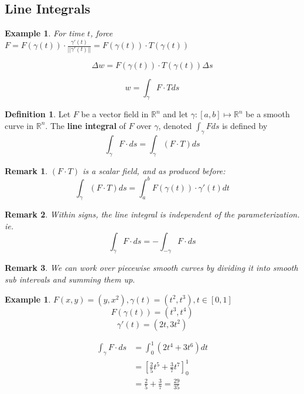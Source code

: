 \documentclass[12pt]{article}
\theoremstyle{plain}
\newtheorem*{remark}{Remark}
\newtheorem{example}[theorem]{Example}
\theoremstyle{definition}
\newtheorem{definition}[theorem]{Definition}
\begin{document}
\subsection{Line Integrals}

\begin{example}
	For time $t$, force $F = F(\gamma(t)) \cdot \frac{\gamma ' (t)}{||\gamma ' (t)||} = F(\gamma (t)) \cdot T (\gamma (t))$

	$$\Delta w = F(\gamma(t)) \cdot T (\gamma (t)) \Delta s$$

	$$w= \int_\gamma F \cdot T ds$$

\end{example}

\begin{definition}
	Let $F$ be a vector field in $\mathbb{R}^n$ and let $\gamma : [a,b] \mapsto \mathbb{R}^n$ be a smooth curve in $\mathbb{R}^n$. The \textbf{line integral} of $F$ over $\gamma$, denoted $\int_\gamma F ds$ is defined by
	$$\int_\gamma F \cdot ds = \int_\gamma ( F \cdot T) ds$$
\end{definition}

\begin{remark}
	$(F \cdot T)$ is a scalar field, and as produced before:
	$$\int_\gamma ( F \cdot T) ds = \int_a^b F(\gamma(t)) \cdot \gamma ' (t) dt$$
\end{remark}

\begin{remark}
	Within signs, the line integral is independent of the parameterization. ie.
	$$\int_\gamma F \cdot ds = - \int_{-\gamma} F \cdot ds$$
\end{remark}

\begin{remark}
	We can work over piecewise smooth curves by dividing it into smooth sub intervals and summing them up.
\end{remark}

\begin{example}
	$F(x,y) = (y,x^2), \gamma (t) = (t^2, t^3), t\in[0,1]$
	$$F(\gamma (t)) = (t^3, t^4)$$
	$$\gamma ' (t) = (2t, 3t^2)$$

	\begin{align*}
		\int_\gamma F \cdot ds &= \int_0^1 (2t^4 + 3t^6) dt\\
		&= [\frac{2}{5} t^5 + \frac{3}{7} t^7]^1_0\\
		&= \frac{2}{5}+ \frac{3}{7} = \frac{29}{35}
	\end{align*}

\end{example}
\end{document}
